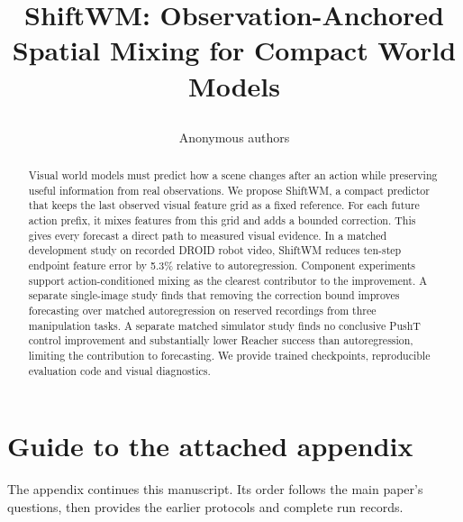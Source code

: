 \documentclass{article}
\title{\raggedright ShiftWM: Observation-Anchored Spatial Mixing for Compact World Models}
\author{Anonymous authors}
\begin{document}
\maketitle
\begin{abstract}
Visual world models must predict how a scene changes after an action while preserving useful information from real observations. We propose ShiftWM, a compact predictor that keeps the last observed visual feature grid as a fixed reference. For each future action prefix, it mixes features from this grid and adds a bounded correction. This gives every forecast a direct path to measured visual evidence. In a matched development study on recorded DROID robot video, ShiftWM reduces ten-step endpoint feature error by 5.3\% relative to autoregression. Component experiments support action-conditioned mixing as the clearest contributor to the improvement. A separate single-image study finds that removing the correction bound improves forecasting over matched autoregression on reserved recordings from three manipulation tasks. A separate matched simulator study finds no conclusive PushT control improvement and substantially lower Reacher success than autoregression, limiting the contribution to forecasting. We provide trained checkpoints, reproducible evaluation code and visual diagnostics.
\end{abstract}









\clearpage
\appendix
{}
\section*{Guide to the attached appendix}
The appendix continues this manuscript. Its order follows the main paper's
questions, then provides the earlier protocols and complete run records.
\end{document}
